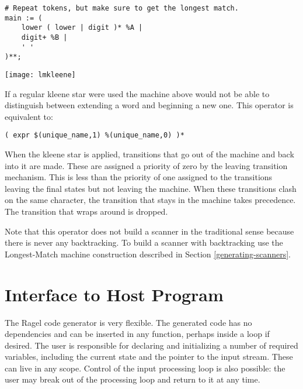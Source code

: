 \documentclass[letterpaper,11pt,oneside]{book}
\newcommand{\verbspace}{\vspace{10pt}}
\newcommand{\graphspace}{\vspace{10pt}}
\newenvironment{inline_code}{\def\baselinestretch{1}\vspace{12pt}\small}{}
\begin{document}
\begin{inline_code}
\begin{verbatim}
# Repeat tokens, but make sure to get the longest match.
main := (
    lower ( lower | digit )* %A | 
    digit+ %B | 
    ' '
)**;
\end{verbatim}
\end{inline_code}

\graphspace
\begin{center}
\texttt{[image: lmkleene]}
\end{center}
\graphspace

If a regular kleene star were used the machine above would not be able to
distinguish between extending a word and beginning a new one.  This operator is
equivalent to:

\verbspace
\begin{verbatim}
( expr $(unique_name,1) %(unique_name,0) )*
\end{verbatim}
\verbspace

When the kleene star is applied, transitions that go out of the machine and
back into it are made. These are assigned a priority of zero by the leaving 
transition mechanism. This is less than the priority of one assigned to the
transitions leaving the final states but not leaving the machine. When 
these transitions clash on the same character, the 
transition that stays in the machine takes precedence.  The transition
that wraps around is dropped.

Note that this operator does not build a scanner in the traditional sense
because there is never any backtracking. To build a scanner with backtracking
use the Longest-Match machine construction described in Section
\ref{generating-scanners}.

\chapter{Interface to Host Program}

The Ragel code generator is very flexible. The generated code has no
dependencies and can be inserted in any function, perhaps inside a loop if
desired.  The user is responsible for declaring and initializing a number of
required variables, including the current state and the pointer to the input
stream. These can live in any scope. Control of the input processing loop is
also possible: the user may break out of the processing loop and return to it
at any time.
\end{document}
